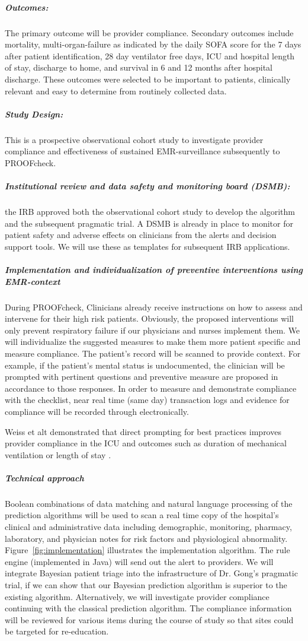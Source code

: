 \documentclass[11pt,notitlepage]{article}
\begin{document}
\subparagraph*{Outcomes:}
The primary outcome will be provider compliance. Secondary outcomes include mortality, multi-organ-failure as indicated by the daily SOFA score for the 7 days after patient identification, 28 day ventilator free days, ICU and hospital length of stay, discharge to home, and survival in 6 and 12 months after hospital discharge. These outcomes were selected to be important to patients, clinically relevant and easy to determine from routinely collected data.

\subparagraph*{Study Design:}
This is a prospective observational cohort study to investigate provider compliance and effectiveness of sustained EMR-surveillance subsequently to PROOFcheck.

\subparagraph*{Institutional review and data safety and monitoring board (DSMB):} the IRB approved both the observational cohort study to develop the algorithm and the subsequent pragmatic trial. A DSMB is already in place to monitor for patient safety and adverse effects on clinicians from the alerts and decision support tools. We will use these as templates for subsequent IRB applications. 

\subparagraph*{Implementation and individualization of preventive interventions using EMR-context}
During PROOFcheck, Clinicians  already receive  instructions on how to assess and intervene for their high risk patients. Obviously, the proposed interventions will only prevent respiratory failure if our physicians and nurses implement them. We will individualize the suggested measures to make them more patient specific and measure compliance. The patient's record will be scanned to provide context. For example, if the patient's mental status is undocumented, the clinician will be prompted with pertinent questions and preventive measure are proposed in accordance to those responses. In order to measure and demonstrate compliance with the checklist, near real time (same day) transaction logs and evidence for compliance will be recorded through electronically. 

Weiss et alt demonstrated that direct prompting for best practices improves provider compliance in the ICU and outcomes such as duration of mechanical ventilation or length of stay \cite{Weiss_21616996}. 

\subparagraph*{Technical approach}
Boolean combinations of data matching and natural language processing of the prediction algorithms will be used to scan a real time copy of the hospital's clinical and administrative data including demographic, monitoring, pharmacy, laboratory, and physician notes for risk factors and physiological abnormality. Figure~\ref{fig:implementation} illustrates the implementation algorithm. The rule engine (implemented in Java) will send out the alert to providers.
We will integrate Bayesian patient triage into the infrastructure of Dr. Gong's pragmatic trial, if we can show that our Bayesian prediction algorithm is superior to the existing algorithm. Alternatively, we will investigate provider compliance continuing with the classical prediction algorithm. The compliance information will be reviewed for various items during the course of study so that sites could be targeted for re-education.
\end{document}
